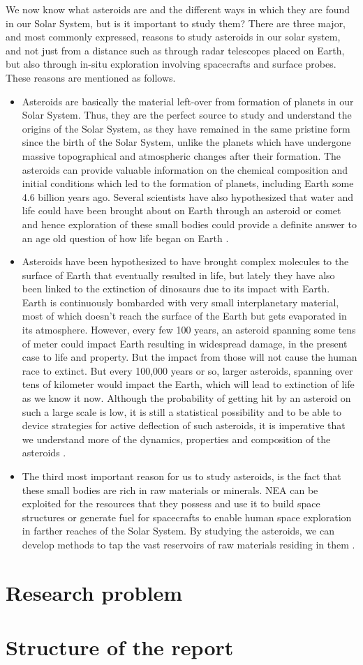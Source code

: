 We now know what asteroids are and the different ways in which they are found in our Solar System, but is it important to study them? There are three major, and most commonly expressed, reasons to study asteroids in our solar system, and not just from a distance such as through radar telescopes placed on Earth, but also through in-situ exploration involving spacecrafts and surface probes. These reasons are mentioned as follows.
\begin{itemize}
\item Asteroids are basically the material left-over from formation of planets in our Solar System. Thus, they are the perfect source to study and understand the origins of the Solar System, as they have remained in the same pristine form since the birth of the Solar System, unlike the planets which have undergone massive topographical and atmospheric changes after their formation. The asteroids can provide valuable information on the chemical composition and initial conditions which led to the formation of planets, including Earth some 4.6 billion years ago. Several scientists have also hypothesized that water and life could have been brought about on Earth through an asteroid or comet and hence exploration of these small bodies could provide a definite answer to an age old question of how life began on Earth \parencite{whyAsteroidsWeb}.
\item Asteroids have been hypothesized to have brought complex molecules to the surface of Earth that eventually resulted in life, but lately they have also been linked to the extinction of dinosaurs due to its impact with Earth. Earth is continuously bombarded with very small interplanetary material, most of which doesn't reach the surface of the Earth but gets evaporated in its atmosphere. However, every few 100 years, an asteroid spanning some tens of meter could impact Earth resulting in widespread damage, in the present case to life and property. But the impact from those will not cause the human race to extinct. But every 100,000 years or so, larger asteroids, spanning over tens of kilometer would impact the Earth, which will lead to extinction of life as we know it now. Although the probability of getting hit by an asteroid on such a large scale is low, it is still a statistical possibility and to be able to device strategies for active deflection of such asteroids, it is imperative that we understand more of the dynamics, properties and composition of the asteroids \parencite{whyAsteroidsWeb}.
\item The third most important reason for us to study asteroids, is the fact that these small bodies are rich in raw materials or minerals. \gls{NEA} can be exploited for the resources that they possess and use it to build space structures or generate fuel for spacecrafts to enable human space exploration in farther reaches of the Solar System. By studying the asteroids, we can develop methods to tap the vast reservoirs of raw materials residing in them \parencite{whyAsteroidsWeb}.
\end{itemize}

\section{Research problem}

\section{Structure of the report}


